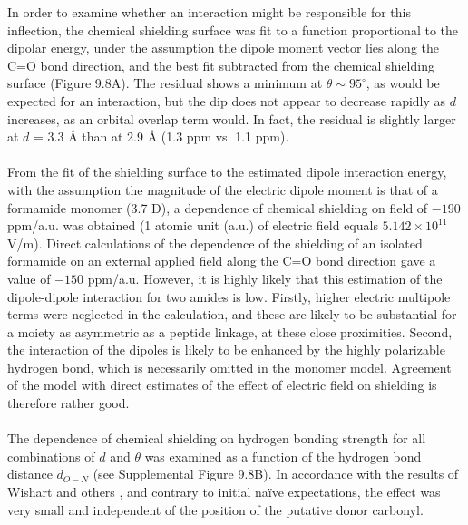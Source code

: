 \begin{doublespace}
In order to examine whether an \npipistar{} interaction might be responsible
for this inflection, the chemical shielding surface was fit to a function
proportional to the dipolar energy, under the assumption the dipole moment
vector lies along the C=O bond direction, and the best fit subtracted from the
chemical shielding surface (Figure 9.8A). The residual shows a
minimum at $\theta \sim 95^\circ$, as would be expected for an \npipistar{}
interaction, but the dip does not appear to decrease rapidly as $d$ increases,
as an orbital overlap term would. In fact, the residual is slightly larger at
$d$ = 3.3 \r{A} than at 2.9 \r{A} (1.3 ppm vs. 1.1 ppm).
\\\\
From the fit of the shielding surface to the estimated dipole interaction
energy, with the assumption the magnitude of the electric dipole moment is
that of a formamide monomer (3.7 D), a dependence of chemical shielding on
field of $-190$ ppm/a.u. was obtained (1 atomic unit (a.u.) of electric field
equals $5.142\times10^{11}$ V/m). Direct calculations of the dependence of the
shielding of an isolated formamide on an external applied field along the C=O
bond direction gave a value of $-150$ ppm/a.u. However, it is highly likely
that this estimation of the dipole-dipole interaction for two amides is low.
Firstly, higher electric multipole terms were neglected in the calculation,
and these are likely to be substantial for a moiety as asymmetric as a peptide
linkage, at these close proximities. Second, the interaction of the dipoles
is likely to be enhanced by the highly polarizable hydrogen bond, which is
necessarily omitted in the monomer model. Agreement of the model with direct
estimates of the effect of electric field on shielding is therefore rather
good.
\\\\
The dependence of chemical shielding on hydrogen bonding strength for all
combinations of $d$ and $\theta$ was examined as a function of the hydrogen
bond distance $d_{O-N}$ (see Supplemental Figure 9.8B). In accordance with the
results of Wishart and others
\cite{cisnetti:cpc2004,neal:jbnmr2003,markwick:jacs2004}, and contrary
to initial na\"{i}ve expectations, the effect was very small and independent of
the position of the putative \npipistar{} donor carbonyl.
\end{doublespace}

